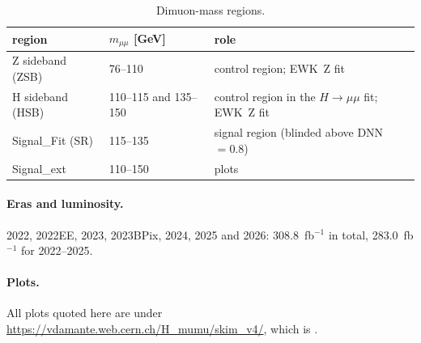 \documentclass[11pt,a4paper]{article}
\newcommand{\www}{https://vdamante.web.cern.ch/H_mumu/skim_v4}
\begin{document}
\begin{table}[H]\centering\small
\begin{tabular}{lll}
\toprule
region & $m_{\mu\mu}$ [GeV] & role \\
\midrule
Z sideband (ZSB) & 76--110 & control region; EWK~Z fit \\
H sideband (HSB) & 110--115 and 135--150 & control region in the $H\to\mu\mu$ fit; EWK~Z fit \\
Signal\_Fit (SR) & 115--135 & signal region (blinded above DNN $=0.8$) \\
Signal\_ext & 110--150 & plots \\
\bottomrule
\end{tabular}
\caption{Dimuon-mass regions.}
\end{table}

\paragraph{Eras and luminosity.} 2022, 2022EE, 2023, 2023BPix, 2024, 2025 and
2026: 308.8~fb$^{-1}$ in total, 283.0~fb$^{-1}$ for 2022--2025.

\paragraph{Plots.} All plots quoted here are under \url{\www/}, which is
.
\end{document}
